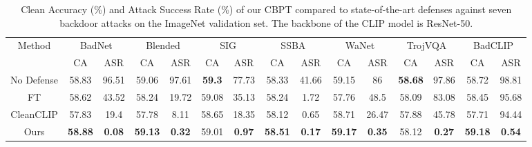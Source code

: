 \begin{table*}[htbp]
  \centering
  \caption{Clean Accuracy (\%) and Attack Success Rate (\%) of our CBPT compared to state-of-the-art defenses against seven backdoor attacks on the ImageNet validation set. The backbone of the CLIP model is ResNet-50.}
  \resizebox{16cm}{!}
  {\begin{tabular}{ccccccccccccccc} 
    \toprule
    \multicolumn{1}{c}{\multirow{2}[0]{*}{Method}} 
    & \multicolumn{2}{c}{BadNet}          
    & \multicolumn{2}{c}{Blended}          
    & \multicolumn{2}{c}{SIG}          
    & \multicolumn{2}{c}{SSBA}          
    & \multicolumn{2}{c}{WaNet}          
    & \multicolumn{2}{c}{TrojVQA}          
    & \multicolumn{2}{c}{BadCLIP} \\ 

    \cmidrule(lr){2-3} 
    \cmidrule(lr){4-5} 
    \cmidrule(lr){6-7} 
    \cmidrule(lr){8-9} 
    \cmidrule(lr){10-11} 
    \cmidrule(lr){12-13} 
    \cmidrule(lr){14-15}
    
    & CA & ASR 
    & CA & ASR 
    & CA & ASR 
    & CA & ASR 
    & CA & ASR 
    & CA & ASR 
    & CA & ASR \\ 
    
    \midrule
    
    No Defense   
    & 58.83    & 96.51    & 59.06    & 97.61    & \textbf{59.3} & 77.73    & 58.33    & 41.66    & 59.15    & 86       & \textbf{58.68} & 97.86    & 58.72    & 98.81 \\
    
    FT          
    & 58.62    & 43.52    & 58.24    & 19.72    & 59.08    & 35.13    & 58.24    & 1.72     & 57.76    & 48.5     & 58.09    & 83.08    & 58.45    & 95.68 \\
    
    CleanCLIP   
    & 57.83    & 19.4     & 57.78    & 8.11     & 58.65    & 18.35    & 58.12    & 0.65     & 58.71    & 26.47    & 57.88    & 45.78    & 57.71    & 94.44 \\
    
    \cellcolor[gray]{0.9} Ours        
    & \cellcolor[gray]{0.9}\textbf{58.88} & \cellcolor[gray]{0.9}\textbf{0.08}  
    & \cellcolor[gray]{0.9}\textbf{59.13} & \cellcolor[gray]{0.9}\textbf{0.32} 
    & \cellcolor[gray]{0.9}59.01 & \cellcolor[gray]{0.9}\textbf{0.97} 
    & \cellcolor[gray]{0.9}\textbf{58.51} & \cellcolor[gray]{0.9}\textbf{0.17} 
    & \cellcolor[gray]{0.9}\textbf{59.17} & \cellcolor[gray]{0.9}\textbf{0.35} 
    & \cellcolor[gray]{0.9}58.12 & \cellcolor[gray]{0.9}\textbf{0.27}  
    & \cellcolor[gray]{0.9}\textbf{59.18} & \cellcolor[gray]{0.9}\textbf{0.54} \\ 
    
    \bottomrule
  \end{tabular}
  }
  \label{main_tab}%
\end{table*}

